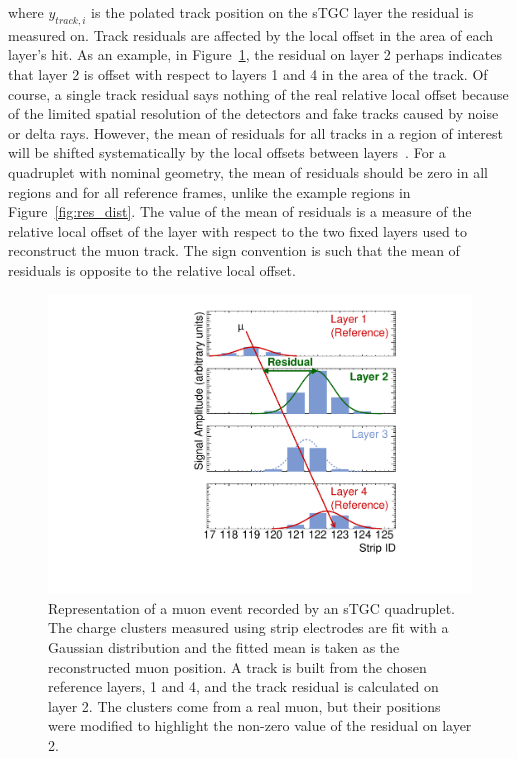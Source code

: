 where $y_{track, i}$ is the polated track position on the sTGC layer the residual is measured on. Track residuals are affected by the local offset in the area of each layer's hit. As an example, in Figure~\ref{fig:fake_event_display}, the residual on layer 2 perhaps indicates that layer 2 is offset with respect to layers 1 and 4 in the area of the track. Of course, a single track residual says nothing of the real relative local offset because of the limited spatial resolution of the detectors and fake tracks caused by noise or delta rays. However, the mean of residuals for all tracks in a region of interest will be shifted systematically by the local offsets between layers~\cite{lefebvre_thesis}. For a quadruplet with nominal geometry, the mean of residuals should be zero in all regions and for all reference frames, unlike the example regions in Figure~\ref{fig:res_dist}. The value of the mean of residuals is a measure of the relative local offset of the layer with respect to the two fixed layers used to reconstruct the muon track. The sign convention is such that the mean of residuals is opposite to the relative local offset.

\begin{figure}
    \centering
    \includegraphics[width = \textwidth]{figures/figure_fake_event_display.pdf}
    \caption{Representation of a muon event recorded by an sTGC quadruplet. The charge clusters measured using strip electrodes are fit with a Gaussian distribution and the fitted mean is taken as the reconstructed muon position. A track is built from the chosen reference layers, 1 and 4, and the track residual is calculated on layer 2. The clusters come from a real muon, but their positions were modified to highlight the non-zero value of the residual on layer 2.}
    \label{fig:fake_event_display}
\end{figure}

